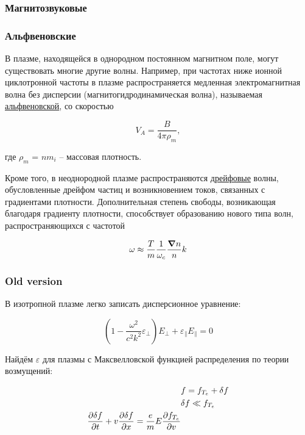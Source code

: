 \documentclass[10pt, a4paper]{article}
\begin{document}
\subsubsection{Магнитозвуковые}



\subsubsection{Альфвеновские}

В плазме, находящейся в однородном постоянном магнитном поле, могут существовать многие другие волны. Например, при частотах ниже ионной циклотронной частоты в плазме распространяется медленная  электромагнитная волна без дисперсии (магнитогидродинамическая волна), называемая \uline{альфвеновской}, со скоростью 

\begin{equation*}
	V_A = \frac{B}{4\pi\rho_m},
\end{equation*}

где $\rho_m$ = $nm_i$ -- массовая плотность.

Кроме того, в неоднородной плазме распространяются \uline{дрейфовые} волны, обусловленные дрейфом частиц и возникновением токов, связанных с  градиентами плотности. Дополнительная степень свободы, возникающая  благодаря градиенту плотности, способствует образованию нового типа волн, распространяющихся с частотой~\cite{kroll} 

\begin{equation*}
	\omega\approx\frac{T}{m}\frac{1}{\omega_c}\frac{\grad{n}}{n}k
\end{equation*}

\subsubsection{Old version}

В изотропной плазме легко записать дисперсионное уравнение:

\begin{equation}
    \left(1-\frac{\omega^2}{c^2 k^2} \varepsilon_{\perp}\right) E_{\perp} + \varepsilon_{\parallel} E_{\parallel}= 0
\end{equation}

Найдём $\varepsilon$ для плазмы с Максвелловской функцией распределения по теории возмущений:

\begin{align*}
	& f = f_{T_e} + \delta f \\
	& \delta f \ll f_{T_e} \\
	\pdv{\delta f}{t} + v\pdv{\delta f}{x} = \frac{e}{m}E \pdv{f_{T_e}}{v}
\end{align*}
\end{document}
